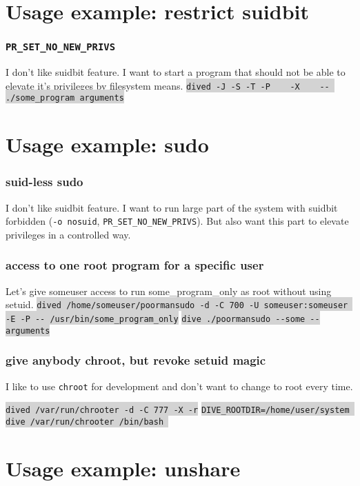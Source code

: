\documentclass[aspectratio=43]{beamer}
\newcommand{\G}[1]{\colorbox{lightgray}{#1}}
\newcommand{\C}{\lstinline}
\begin{document}
\section{Usage example: restrict suidbit}


\begin{frame}
    \frametitle{\C!PR_SET_NO_NEW_PRIVS!}
    I don't like suidbit feature.
    \pause  \vfill 
    I want to start a program that should not be able to elevate it's privileges by filesystem means.
    \pause \vfill
    \G{\C!dived -J -S -T -P    -X    -- ./some_program arguments!}
\end{frame}

\section{Usage example: sudo}

\begin{frame}
    \frametitle{suid-less sudo}
     I don't like suidbit feature.
     \pause  \vfill I want to run large part of the system with suidbit forbidden (\C!-o nosuid!, \C!PR_SET_NO_NEW_PRIVS!).
     \pause  \vfill But also want this part to elevate privileges in a controlled way.
\end{frame}


\begin{frame}
    \frametitle{access to one root program for a specific user}
    Let's give someuser access to run some\_program\_only as root without using setuid.
    \pause \vfill
    \G{\C!dived /home/someuser/poormansudo -d -C 700 -U someuser:someuser -E -P -- /usr/bin/some_program_only!}
    \pause \vfill
    \G{\C!dive ./poormansudo --some --arguments!}
\end{frame}

\begin{frame}
    \frametitle{give anybody chroot, but revoke setuid magic}
    
    I like to use \C!chroot! for development and don't want to change to root every time.

    \pause \vfill
    \G{\C!dived /var/run/chrooter -d -C 777 -X -r!}
    \pause \vfill
    \G{\C!DIVE_ROOTDIR=/home/user/system dive /var/run/chrooter /bin/bash !}
\end{frame}

\section{Usage example: unshare}
\end{document}

